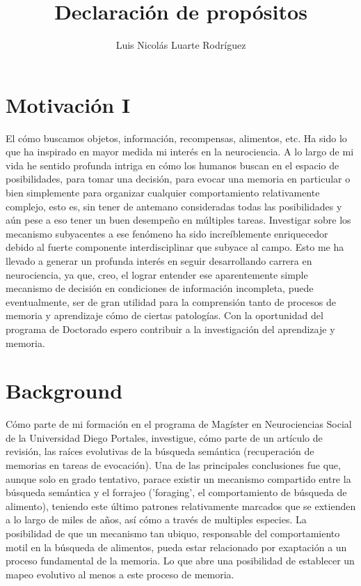 \documentclass[11pt]{article}
\author{Luis Nicolás Luarte Rodríguez}
\date{}
\title{Declaración de propósitos}
\begin{document}
\maketitle
\section{Motivación I}
\label{sec:org8c3ca2f}
El cómo buscamos objetos, información, recompensas, alimentos, etc. Ha
sido lo que ha inspirado en mayor medida mi interés en la
neurociencia. A lo largo de mi vida he sentido profunda intriga en
cómo los humanos buscan en el espacio de posibilidades, para tomar una
decisión, para evocar una memoria en particular o bien simplemente
para organizar cualquier comportamiento relativamente complejo, esto
es, sin tener de antemano consideradas todas las posibilidades y aún
pese a eso tener un buen desempeño en múltiples tareas. Investigar
sobre los mecanismo subyacentes a ese fenómeno ha sido increíblemente
enriquecedor debido al fuerte componente interdisciplinar que subyace al
campo. Esto me ha llevado a generar un profunda interés en seguir
desarrollando carrera en neurociencia, ya que, creo, el lograr
entender ese aparentemente simple mecanismo de decisión en condiciones
de información incompleta, puede eventualmente, ser de gran utilidad
para la comprensión tanto de procesos de memoria y aprendizaje cómo de
ciertas patologías. Con la oportunidad del programa de Doctorado
espero contribuir a la investigación del aprendizaje y memoria.
\section{Background}
\label{sec:org9334018}
Cómo parte de mi formación en el programa de Magíster en Neurociencias
Social de la Universidad Diego Portales, investigue, cómo parte de un
artículo de revisión, las raíces evolutivas de la búsqueda semántica
(recuperación de memorias en tareas de evocación). Una de las
principales conclusiones fue que, aunque solo en grado tentativo,
parace existir un mecanismo compartido entre la búsqueda semántica y
el forrajeo ('foraging', el comportamiento de búsqueda de alimento),
teniendo este último patrones relativamente marcados que se extienden
a lo largo de miles de años, así cómo a través de multiples
especies. La posibilidad de que un mecanismo tan ubiquo, responsable
del comportamiento motil en la búsqueda de alimentos, pueda estar
relacionado por exaptación a un proceso fundamental de la memoria. Lo
que abre una posibilidad de establecer un mapeo evolutivo al menos a
este proceso de memoria.
\end{document}
